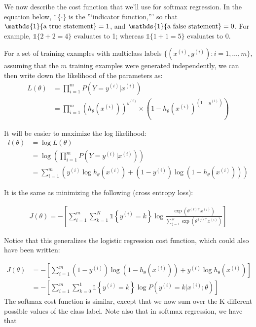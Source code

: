 We now describe the cost function that we’ll use for softmax regression. In the equation below, $\mathds{1}\{\cdot\}$ is the ”‘indicator function,”’ so that $\mathds{1}\{\hbox{a true statement}\}=1$, and $\mathds{1}\{\hbox{a false statement}\}=0$. For example, $\mathds{1}\{2+2=4\}$ evaluates to 1; whereas $\mathds{1}\{1+1=5\}$ evaluates to 0. 


For a set of training examples with multiclass labels $\{ (x^{(i)}, y^{(i)}) : i=1,\ldots,m\}$, assuming that the $m$ training examples were generated independently, we can then write down the likelihood of the parameters as:
\begin{align}
	L(\theta) &= \prod_{i=1}^m P(Y=y^{(i)} | x^{(i)} ) \\
			  &= \prod_{i=1}^m (h_\theta(x^{(i)}))^{y^{(i)}} \times (1 - h_\theta(x^{(i)})^{(1-y^{(i)})})
\end{align}

It will be easier to maximize the log likelihood:
\begin{align}
	l(\theta) &= \log L(\theta) \\
			  &= \log \left( \prod_{i=1}^m P(Y=y^{(i)} | x^{(i)}) \right) \\
			  &= \sum_{i=1}^m \left( y^{(i)}\log h_\theta(x^{(i)}) + (1-y^{(i)})\log (1 - h_\theta(x^{(i)})) \right)
\end{align}

It is the same as minimizing the following (cross entropy loss):

\begin{align} 
	J(\theta) = - \left[ \sum_{i=1}^{m} \sum_{k=1}^{K} \mathds{1}\left\{y^{(i)} = k\right\} \log \frac{\exp(\theta^{(k)\top} x^{(i)})}{\sum_{j=1}^K \exp(\theta^{(j)\top} x^{(i)})}\right] 
\end{align}

Notice that this generalizes the logistic regression cost function, which could also have been written:

\begin{align}
	J(\theta) &= - \left[ \sum_{i=1}^m (1-y^{(i)}) \log (1-h_\theta(x^{(i)})) + y^{(i)} \log h_\theta(x^{(i)}) \right] \\ 
			  &= - \left[ \sum_{i=1}^{m} \sum_{k=0}^{1} \mathds{1}\left\{y^{(i)} = k\right\} \log P(y^{(i)} = k | x^{(i)} ; \theta) \right] 
\end{align}
The softmax cost function is similar, except that we now sum over the K different possible values of the class label. Note also that in softmax regression, we have that

